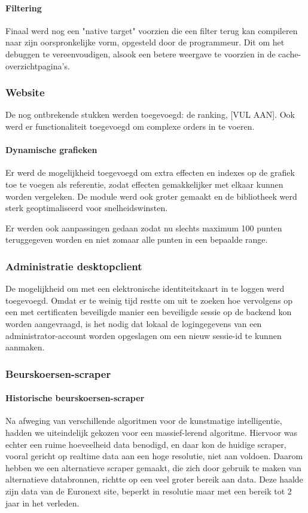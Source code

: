 \paragraph{Filtering}
Finaal werd nog een "native target" voorzien die een filter terug kan compileren naar zijn oorspronkelijke vorm, opgesteld door de programmeur. Dit om het debuggen te vereenvoudigen, alsook een betere weergave te voorzien in de cache-overzichtpagina's.

\subsubsection{Website}
De nog ontbrekende stukken werden toegevoegd: de ranking, [VUL AAN]. Ook werd er functionaliteit toegevoegd om complexe orders in te voeren.

\paragraph{Dynamische grafieken}
Er werd de mogelijkheid toegevoegd om extra effecten en indexes op de grafiek toe te voegen als referentie, zodat effecten gemakkelijker met elkaar kunnen worden vergeleken. 
De module werd ook groter gemaakt en de bibliotheek werd sterk geoptimaliseerd voor snelheidswinsten.

Er werden ook aanpassingen gedaan zodat nu slechts maximum 100 punten teruggegeven worden en niet zomaar alle punten in een bepaalde range.

\subsubsection{Administratie desktopclient}
De mogelijkheid om met een elektronische identiteitskaart in te loggen werd toegevoegd. Omdat er te weinig tijd restte om uit te zoeken hoe vervolgens op een met certificaten beveiligde manier een beveiligde sessie op de backend kon worden aangevraagd, is het nodig dat lokaal de logingegevens van een administrator-account worden opgeslagen om een nieuw sessie-id te kunnen aanmaken.

\subsubsection{Beurskoersen-scraper}

\paragraph{Historische beurskoersen-scraper}
Na afweging van verschillende algoritmen voor de kunstmatige intelligentie, hadden we uiteindelijk gekozen voor een massief-lerend algoritme. Hiervoor was echter een ruime hoeveelheid data benodigd, en daar kon de huidige scraper, vooral gericht op realtime data aan een hoge resolutie, niet aan voldoen. Daarom hebben we een alternatieve scraper gemaakt, die zich door gebruik te maken van alternatieve databronnen, richtte op een veel groter bereik aan data. Deze haalde zijn data van de Euronext site, beperkt in resolutie maar met een bereik tot 2 jaar in het verleden.

